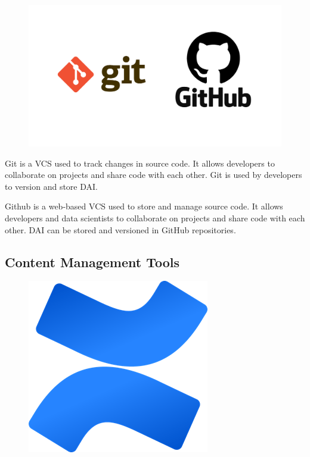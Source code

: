\documentclass[12pt,a4paper]{report}
\begin{document}
\begin{figure}
\includegraphics[width=1\linewidth]{git.png} 
\end{figure}

Git is a \ac{VCS} used to track changes in source code. It allows developers to collaborate on projects and share code with each other. Git is used by developers to version and store \ac{DAI}.

Github is a web-based \ac{VCS} used to store and manage source code. It allows developers and data scientists to collaborate on projects and share code with each other. \ac{DAI} can be stored and versioned in GitHub repositories.

\subsection{Content Management Tools}

\begin{figure}
\includegraphics[width=1\linewidth]{confluence.png}
\end{figure}
\end{document}
